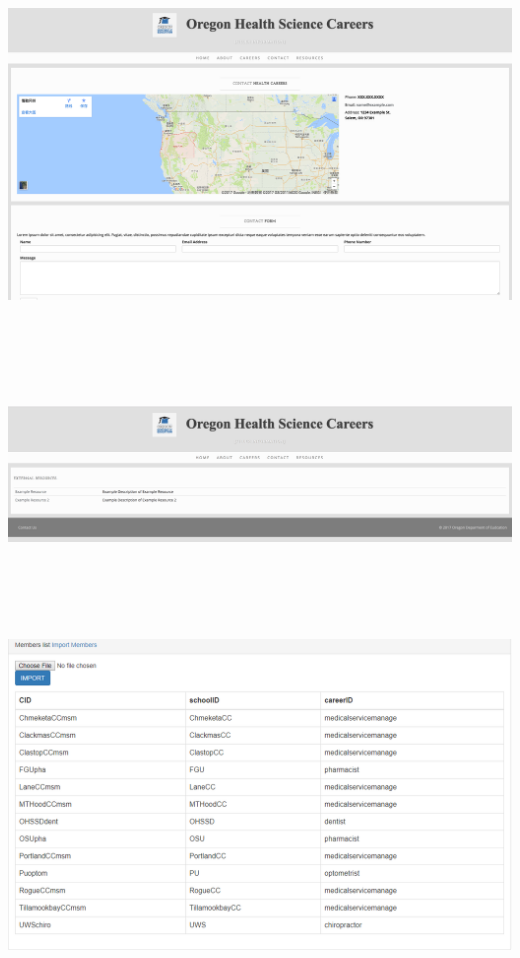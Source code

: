 \documentclass[onecolumn, draftclsnofoot,10pt, compsoc]{IEEEtran}
\begin{document}
\\ \\
\includegraphics[width=16.78cm, height=9.67cm]{website4.png}
\\ \\
\includegraphics[width=16.78cm, height=6cm]{webiste5.png}
\\ \\
\includegraphics[width=16.78cm, height=9.67cm]{DataUpload.png}
\\ \\
\end{document}
